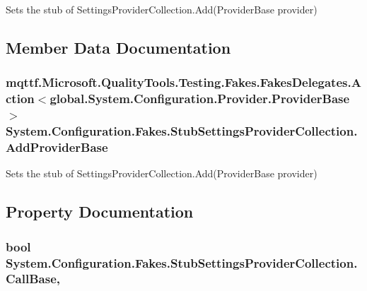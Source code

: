 Sets the stub of Settings\-Provider\-Collection.\-Add(\-Provider\-Base provider)



\subsection{Member Data Documentation}
\hypertarget{class_system_1_1_configuration_1_1_fakes_1_1_stub_settings_provider_collection_a7e4083f1614e24763b5fb9536d6aa3d2}{
\subsubsection[{Add\-Provider\-Base}]{\setlength{\rightskip}{0pt plus 5cm}mqttf.\-Microsoft.\-Quality\-Tools.\-Testing.\-Fakes.\-Fakes\-Delegates.\-Action$<$global.\-System.\-Configuration.\-Provider.\-Provider\-Base$>$ System.\-Configuration.\-Fakes.\-Stub\-Settings\-Provider\-Collection.\-Add\-Provider\-Base}}\label{class_system_1_1_configuration_1_1_fakes_1_1_stub_settings_provider_collection_a7e4083f1614e24763b5fb9536d6aa3d2}


Sets the stub of Settings\-Provider\-Collection.\-Add(\-Provider\-Base provider)



\subsection{Property Documentation}
\hypertarget{class_system_1_1_configuration_1_1_fakes_1_1_stub_settings_provider_collection_a5db0197ac6d1ca93a977e9af495d9239}{
\subsubsection[{Call\-Base}]{\setlength{\rightskip}{0pt plus 5cm}bool System.\-Configuration.\-Fakes.\-Stub\-Settings\-Provider\-Collection.\-Call\-Base\hspace{0.3cm}{\ttfamily [get]}, {\ttfamily [set]}}}\label{class_system_1_1_configuration_1_1_fakes_1_1_stub_settings_provider_collection_a5db0197ac6d1ca93a977e9af495d9239}


